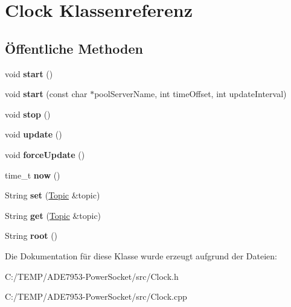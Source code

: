 \hypertarget{class_clock}{}\section{Clock Klassenreferenz}
\label{class_clock}
\subsection*{Öffentliche Methoden}
\begin{DoxyCompactItemize}
\item 
\mbox{\label{class_clock_a8a050959dcff11c85d695989e9099a8c}} 
void {\bfseries start} ()
\item 
\mbox{\label{class_clock_a90f110eacc7a87ce572dc1f2af77e25d}} 
void {\bfseries start} (const char $\ast$pool\+Server\+Name, int time\+Offset, int update\+Interval)
\item 
\mbox{\label{class_clock_a0b77c3e7f33eb7ae0f018e469d96a250}} 
void {\bfseries stop} ()
\item 
\mbox{\label{class_clock_ae7c6708cf04b233655b501a97bb1e802}} 
void {\bfseries update} ()
\item 
\mbox{\label{class_clock_a9df252eb56b672532a02e367a196c8a5}} 
void {\bfseries force\+Update} ()
\item 
\mbox{\label{class_clock_aa8504c02bd77bac45b0cdbb377b0ccd3}} 
time\+\_\+t {\bfseries now} ()
\item 
\mbox{\label{class_clock_a8d7762e8bc2edd4e1da23a4db154f2c3}} 
String {\bfseries set} (\hyperlink{class_topic}{Topic} \&topic)
\item 
\mbox{\label{class_clock_a0241ebe5ed63778f1135b12f669a16ee}} 
String {\bfseries get} (\hyperlink{class_topic}{Topic} \&topic)
\item 
\mbox{\label{class_clock_a0cfec3d5b76b22f96fb012c6dc64ac1e}} 
String {\bfseries root} ()
\end{DoxyCompactItemize}


Die Dokumentation für diese Klasse wurde erzeugt aufgrund der Dateien\+:\begin{DoxyCompactItemize}
\item 
C\+:/\+T\+E\+M\+P/\+A\+D\+E7953-\/\+Power\+Socket/src/Clock.\+h\item 
C\+:/\+T\+E\+M\+P/\+A\+D\+E7953-\/\+Power\+Socket/src/Clock.\+cpp\end{DoxyCompactItemize}

